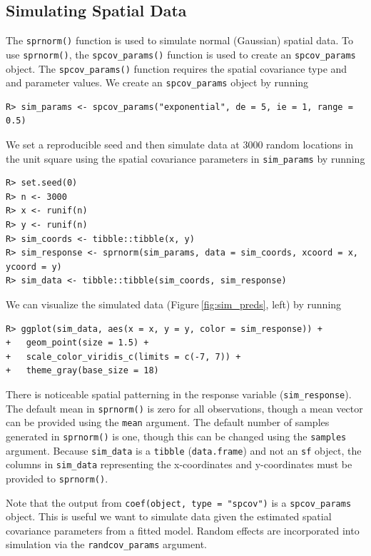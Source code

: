 \documentclass[10pt,letterpaper]{article}
\begin{document}
\hypertarget{sec:sim_data}{%
\subsection{Simulating Spatial Data}\label{sec:sim_data}}

The \texttt{sprnorm()} function is used to simulate normal (Gaussian)
spatial data. To use \texttt{sprnorm()}, the \texttt{spcov\_params()}
function is used to create an \texttt{spcov\_params} object. The
\texttt{spcov\_params()} function requires the spatial covariance type
and and parameter values. We create an \texttt{spcov\_params} object by
running

\begin{verbatim}
R> sim_params <- spcov_params("exponential", de = 5, ie = 1, range = 0.5)
\end{verbatim}

We set a reproducible seed and then simulate data at 3000 random
locations in the unit square using the spatial covariance parameters in
\texttt{sim\_params} by running

\begin{verbatim}
R> set.seed(0)
R> n <- 3000
R> x <- runif(n)
R> y <- runif(n)
R> sim_coords <- tibble::tibble(x, y)
R> sim_response <- sprnorm(sim_params, data = sim_coords, xcoord = x, ycoord = y)
R> sim_data <- tibble::tibble(sim_coords, sim_response)
\end{verbatim}

We can visualize the simulated data (Figure\(~\)\ref{fig:sim_preds},
left) by running

\begin{verbatim}
R> ggplot(sim_data, aes(x = x, y = y, color = sim_response)) +
+   geom_point(size = 1.5) +
+   scale_color_viridis_c(limits = c(-7, 7)) + 
+   theme_gray(base_size = 18)
\end{verbatim}

There is noticeable spatial patterning in the response variable
(\texttt{sim\_response}). The default mean in \texttt{sprnorm()} is zero
for all observations, though a mean vector can be provided using the
\texttt{mean} argument. The default number of samples generated in
\texttt{sprnorm()} is one, though this can be changed using the
\texttt{samples} argument. Because \texttt{sim\_data} is a
\texttt{tibble} (\texttt{data.frame}) and not an \texttt{sf} object, the
columns in \texttt{sim\_data} representing the x-coordinates and
y-coordinates must be provided to \texttt{sprnorm()}.

Note that the output from \texttt{coef(object,\ type\ =\ "spcov")} is a
\texttt{spcov\_params} object. This is useful we want to simulate data
given the estimated spatial covariance parameters from a fitted model.
Random effects are incorporated into simulation via the
\texttt{randcov\_params} argument.
\end{document}
